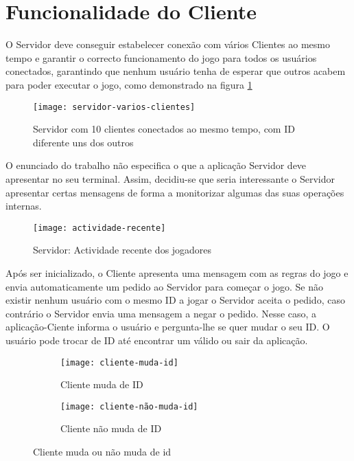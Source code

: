 \section{Funcionalidade do Cliente}

O Servidor deve conseguir estabelecer conexão com vários Clientes ao mesmo tempo e garantir o correcto funcionamento do jogo para todos os usuários conectados, garantindo que nenhum usuário tenha de esperar que outros acabem para poder executar o jogo, como  demonstrado na figura \ref{fig:servidor-varios-clientes}

\begin{figure}[H]
	\centering
	\texttt{[image: servidor-varios-clientes]}
	\caption{Servidor com 10 clientes conectados ao mesmo tempo, com ID diferente uns dos outros\\}
	\label{fig:servidor-varios-clientes}
\end{figure}

O enunciado do trabalho não especifica o que a aplicação Servidor deve apresentar no seu terminal. Assim, decidiu-se que seria interessante o Servidor apresentar certas mensagens de forma a monitorizar algumas das suas operações internas.  

\begin{figure}[H]
	\centering
	\texttt{[image: actividade-recente]}
	\caption{Servidor: Actividade recente dos jogadores\\}
	\label{fig:actividade-recente}
\end{figure}

Após ser inicializado, o Cliente apresenta uma mensagem com as regras do jogo e envia automaticamente um pedido ao Servidor para começar o jogo. Se não existir nenhum usuário com o mesmo ID a jogar o Servidor aceita o pedido, caso contrário o Servidor envia uma mensagem a negar o pedido. Nesse caso, a aplicação-Ciente informa o usuário e pergunta-lhe se quer mudar o seu ID. O usuário pode trocar de ID até encontrar um válido ou sair da aplicação.

\begin{figure}[H]
	\centering
	\begin{subfigure}[t]{0.45\textwidth}
		\centering
		\texttt{[image: cliente-muda-id]}
		\caption{Cliente muda de ID}
		\label{fig:cliente-muda-id}
	\end{subfigure}
	\begin{subfigure}[t]{0.45\textwidth}
		\centering
		\texttt{[image: cliente-não-muda-id]}
		\caption{Cliente não muda de ID}
		\label{fig:cliente-não-muda-id}
	\end{subfigure}	
	\caption{ Cliente muda ou não muda de id  }
	\label{fig:mudar-id}
\end{figure}	

